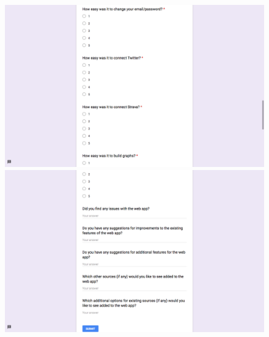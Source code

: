 \documentclass[11pt,openright,a4paper]{report}
\begin{document}
\begin{appendices}
\begin{figure}[ht]
  \centering
  \includegraphics[width=\textwidth]{i/testingquestionnaire4.png}
  \includegraphics[width=\textwidth]{i/testingquestionnaire5.png}
\end{figure}

\clearpage

\end{appendices}
\end{document}
